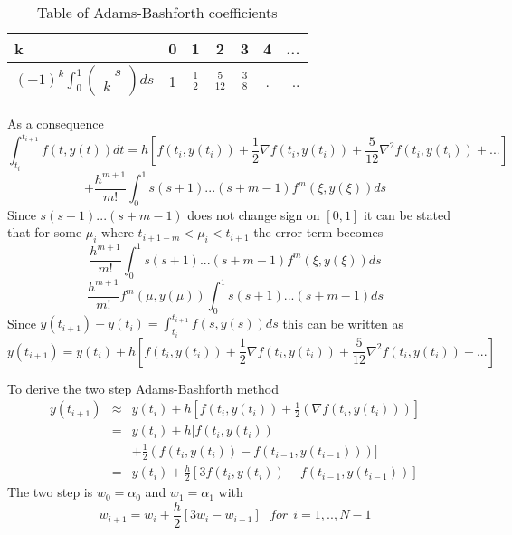 \begin{table}[H]
\begin{center}
\caption{Table of Adams-Bashforth coefficients}
\begin{tabular}{l|c|c|c|c|c|r}
\hline
k&0&1&2&3&4&...\\
\hline
$(-1)^k\int_{0}^{1}\left(\begin{array}{c}-s \\ k \end{array}\right)ds$& 1 & $\frac{1}{2}$ &$ \frac{5}{12}$ & $\frac{3}{8}$ & .&..
\end{tabular}
\end{center}
\end{table}
As a consequence
\[ \int_{t_i}^{t_{i+1}} f(t,y(t)) dt= h\left[ f(t_i,y(t_i))+\frac{1}{2}\nabla f(t_i,y(t_i))+\frac{5}{12}\nabla^{2} f(t_i,y(t_i))+...\right]\]
\[
+\frac{h^{m+1}}{m!}\int_{0}^{1}s(s+1)...(s+m-1)f^{m}(\xi,y(\xi))ds
\]
Since $s(s+1)...(s+m-1)$ does not change sign on $[0,1]$ it can be stated that for some $\mu_i$ where $t_{i+1-m} < \mu_i < t_{i+1}$ the error term becomes
\[
\frac{h^{m+1}}{m!}\int_{0}^{1}s(s+1)...(s+m-1)f^{m}(\xi,y(\xi))ds
\]
\[
\frac{h^{m+1}}{m!}f^{m}(\mu,y(\mu))\int_{0}^{1}s(s+1)...(s+m-1)ds
\]
Since $y(t_{i+1})-y(t_i)=\int_{t_{i}}^{t_{i+1}}f(s,y(s))ds $ this can be written as
\[y(t_{i+1})=y(t_{i})+h\left[ f(t_i,y(t_i))+\frac{1}{2}\nabla f(t_i,y(t_i))+\frac{5}{12}\nabla^{2} f(t_i,y(t_i))+...\right]\]

\begin{example}
To derive the two step Adams-Bashforth method
\begin{eqnarray*}
y(t_{i+1}) &\approx &y(t_i)+ h[f(t_i,y(t_i))+\frac{1}{2}(\nabla f(t_i,y(t_i)))] \\
&=&y(t_i)+ h[f(t_i,y(t_i))\\
& &+\frac{1}{2}(f(t_i,y(t_i))-f(t_{i-1},y(t_{i-1})))]\\
&=&y(t_i)+ \frac{h}{2}[3f(t_i,y(t_i))-f(t_{i-1},y(t_{i-1}))]
\end{eqnarray*}
The two step  is $w_0=\alpha_0$ and $w_1=\alpha_1$ with
\[w_{i+1}=w_i+\frac{h}{2}[3w_{i}-w_{i-1}] \ \ \ for \ \ i=1,..,N-1 \]
\end{example}

